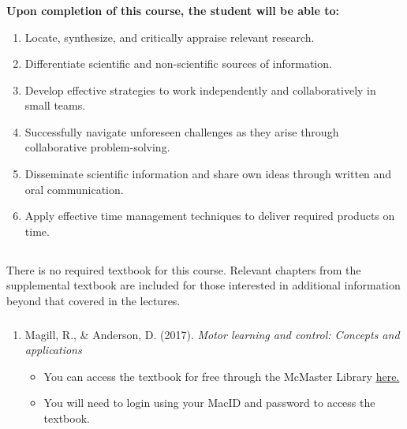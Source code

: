 \documentclass[hidelinks,11pt]{article}
\begin{document}
\vspace{-0.75em}\subsubsection*{{}}
\vspace{-0.75em}\textbf{Upon completion of this course, the student will be able to:}
\vspace{-0.5em}\begin{enumerate}\itemsep0em
  \item Locate, synthesize, and critically appraise relevant research.
  \item Differentiate scientific and non-scientific sources of information.
  \item Develop effective strategies to work independently and collaboratively in small teams.
  \item Successfully navigate unforeseen challenges as they arise through collaborative problem-solving.
  \item Disseminate scientific information and share own ideas through written and oral communication.
  \item Apply effective time management techniques to deliver required products on time.  
\end{enumerate}
  

\subsection*{{}}
\vspace{-0.75em}\subsubsection*{{}}
There is no required textbook for this course. Relevant chapters from the supplemental textbook are included for those interested in additional information beyond that covered in the lectures. 

\vspace{-0.75em}\subsubsection*{{}}
\vspace{-0.5em}\begin{enumerate}\itemsep0em
  \item Magill, R., \& Anderson, D. (2017). \emph{Motor learning and control: Concepts and applications}
  \vspace{-0.5em}\begin{itemize}
    \item You can access the textbook for free through the McMaster Library \href{http://libaccess.mcmaster.ca/login?url=https://accessphysiotherapy.mhmedical.com/Book.aspx?bookid=2311}{\underline{here.}}
    \item You will need to login using your MacID and password to access the textbook.
  \end{itemize}
  \end{enumerate}
\end{document}
